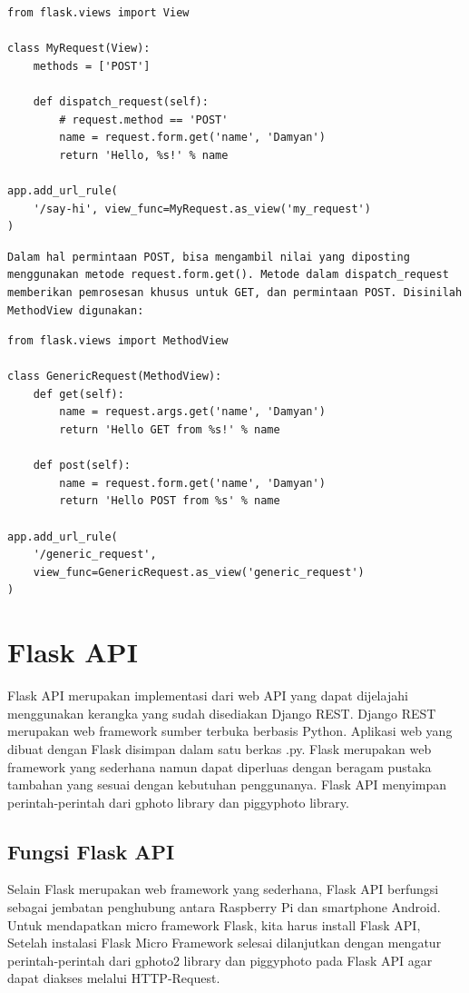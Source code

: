 \begin{verbatim}
from flask.views import View

class MyRequest(View):
    methods = ['POST']

    def dispatch_request(self):
        # request.method == 'POST'
        name = request.form.get('name', 'Damyan')
        return 'Hello, %s!' % name

app.add_url_rule(
    '/say-hi', view_func=MyRequest.as_view('my_request')
)
\end{verbatim}
\begin{verbatim}
Dalam hal permintaan POST, bisa mengambil nilai yang diposting menggunakan metode request.form.get(). Metode dalam dispatch_request memberikan pemrosesan khusus untuk GET, dan permintaan POST. Disinilah MethodView digunakan:
\end{verbatim}
\begin{verbatim}
from flask.views import MethodView

class GenericRequest(MethodView):
    def get(self):
        name = request.args.get('name', 'Damyan')
        return 'Hello GET from %s!' % name

    def post(self):
        name = request.form.get('name', 'Damyan')
        return 'Hello POST from %s' % name

app.add_url_rule(
    '/generic_request',
    view_func=GenericRequest.as_view('generic_request')
)
\end{verbatim}

\section{Flask API}
Flask API merupakan implementasi dari web API yang dapat dijelajahi menggunakan kerangka yang sudah disediakan Django REST. Django REST merupakan web framework sumber terbuka berbasis Python. Aplikasi web yang dibuat dengan Flask disimpan dalam satu berkas .py. Flask merupakan web framework yang sederhana namun dapat diperluas dengan beragam pustaka tambahan yang sesuai dengan kebutuhan penggunanya. Flask API menyimpan perintah-perintah dari gphoto library dan piggyphoto library\cite{computingaplikasi}.

\subsection{Fungsi Flask API}
Selain Flask merupakan web framework yang sederhana, Flask API berfungsi sebagai jembatan penghubung antara Raspberry Pi dan smartphone Android. Untuk mendapatkan micro framework Flask, kita harus install Flask API, Setelah instalasi Flask Micro Framework selesai dilanjutkan dengan mengatur perintah-perintah dari gphoto2 library dan piggyphoto pada Flask API agar dapat diakses melalui HTTP-Request\cite{computingaplikasi}.

